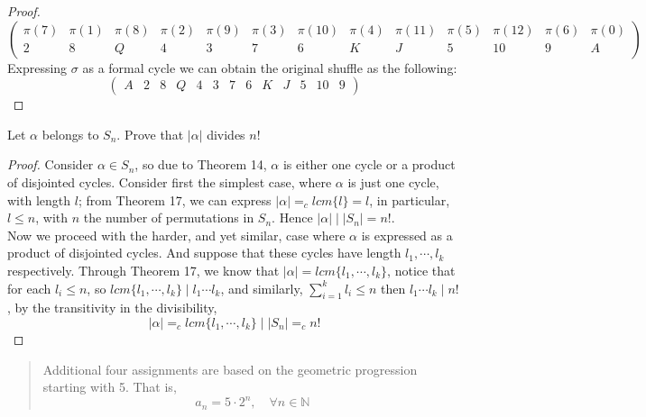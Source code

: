 \begin{assignment}[
  header=HeaderA,
  body=BodyA,
  title={Homework 3},
  duedate={26 February, 2026},
  toc=false,
  toctitle={This appears on the Table of contents.},
  exlist=false
]
\begin{exer}[Problem 5.74]
\begin{proof}
\[\begin{pmatrix}
  \pi(7) & \pi(1) & \pi(8) & \pi(2) & \pi(9) & \pi(3) & \pi(10) & \pi(4) & \pi(11) & \pi(5) & \pi(12) & \pi(6) & \pi(0)        \\
  2 & 8 & Q  & 4 & 3 & 7 & 6 & K  & J & 5 & 10 & 9  & A    
\end{pmatrix}
\]
Expressing $\sigma$ as a formal cycle we can obtain the original shuffle as the following:
\[
\begin{pmatrix}
    A & 2 & 8 & Q  & 4 & 3 & 7 & 6 & K  & J & 5 & 10 & 9 
\end{pmatrix}
\]
\end{proof}
\end{exer}

\begin{exer}[Problem 5.78]
Let $\alpha$ belongs to $S_n$. Prove that $|\alpha|$ divides $n!$
\begin{proof}
Consider $\alpha \in S_n$, so due to Theorem 14, $\alpha$ is either one cycle or a product of disjointed cycles. Consider first the simplest case, where $\alpha$ is just one cycle, with length $l$; from Theorem 17, we can express $|\alpha| =_c lcm\{l\} = l$, in particular, $l \leq n$, with $n$ the number of permutations in $S_n$. Hence $|\alpha| \mid |S_n| = n!$.\\

Now we proceed with the harder, and yet similar, case where $\alpha$ is expressed as a product of disjointed cycles. And suppose that these cycles have length $l_1, \cdots , l_k$ respectively. Through Theorem 17, we know that $|\alpha| = lcm\{l_1,\cdots,l_k\}$, notice that for each $l_i \leq n$, so $lcm\{l_1,\cdots, l_k\} \mid l_1\cdots l_k$, and similarly, $\sum_{i=1}^k l_i \leq n$ then $l_1\cdots l_k \mid n!$, by the transitivity in the divisibility, 
\[
|\alpha| =_c lcm\{l_1,\cdots, l_k\} \mid |S_n| =_c n!
\]
\end{proof}    
\end{exer}

\begin{quote}
    Additional four assignments are based on the geometric progression starting with 5. That is,
    \[
    a_n = 5 \cdot 2^n, \quad \forall n \in \mathbb{N}
    \]
\end{quote}


\end{assignment}
